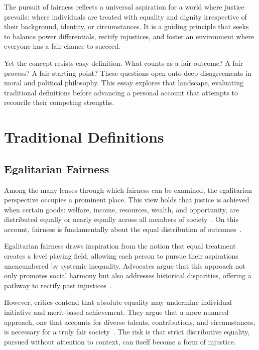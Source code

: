 \documentclass[11pt,showkeys]{essay}
\begin{document}
The pursuit of fairness reflects a universal aspiration for a world where justice prevails: where individuals are treated with equality and dignity irrespective of their background, identity, or circumstances. It is a guiding principle that seeks to balance power differentials, rectify injustices, and foster an environment where everyone has a fair chance to succeed.

Yet the concept resists easy definition. What counts as a fair outcome? A fair process? A fair starting point? These questions open onto deep disagreements in moral and political philosophy. This essay explores that landscape, evaluating traditional definitions before advancing a personal account that attempts to reconcile their competing strengths.

\section{Traditional Definitions}

\subsection{Egalitarian Fairness}

Among the many lenses through which fairness can be examined, the egalitarian perspective occupies a prominent place. This view holds that justice is achieved when certain goods: welfare, income, resources, wealth, and opportunity, are distributed equally or nearly equally across all members of society~\cite{temkin_equality_2019,afolayan_egalitarianism_2015}. On this account, fairness is fundamentally about the equal distribution of outcomes~\cite{eldridge_egalitarianism_2023,johnson_psychology_2023}.

Egalitarian fairness draws inspiration from the notion that equal treatment creates a level playing field, allowing each person to pursue their aspirations unencumbered by systemic inequality. Advocates argue that this approach not only promotes social harmony but also addresses historical disparities, offering a pathway to rectify past injustices~\cite{baiasu_why_2020}.

However, critics contend that absolute equality may undermine individual initiative and merit-based achievement. They argue that a more nuanced approach, one that accounts for diverse talents, contributions, and circumstances, is necessary for a truly fair society~\cite{temkin_equality_2019}. The risk is that strict distributive equality, pursued without attention to context, can itself become a form of injustice.
\end{document}
